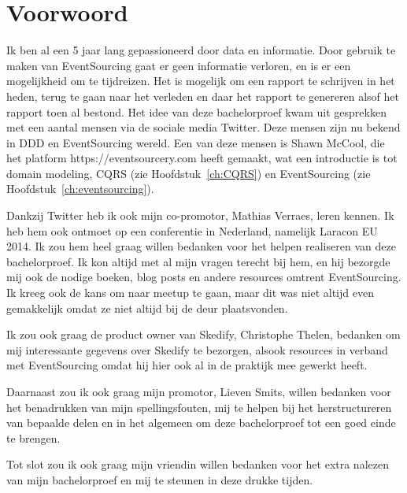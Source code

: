 
\chapter*{Voorwoord}
\label{ch:voorwoord}


Ik ben al een 5 jaar lang gepassioneerd door data en informatie. Door gebruik te maken van EventSourcing gaat er geen informatie verloren, en is er een mogelijkheid om te tijdreizen. Het is mogelijk om een rapport te schrijven in het heden, terug te gaan naar het verleden en daar het rapport te genereren alsof het rapport toen al bestond. Het idee van deze bachelorproef kwam uit gesprekken met een aantal mensen via de sociale media Twitter. Deze mensen zijn nu bekend in \gls{DDD} en EventSourcing wereld. Een van deze mensen is Shawn McCool, die het platform https://eventsourcery.com heeft gemaakt, wat een introductie is tot domain modeling, \gls{CQRS} (zie Hoofdstuk~\ref{ch:CQRS}) en EventSourcing (zie Hoofdstuk~\ref{ch:eventsourcing}).

Dankzij Twitter heb ik ook mijn co-promotor, Mathias Verraes, leren kennen. Ik heb hem ook ontmoet op een conferentie in Nederland, namelijk Laracon EU 2014. Ik zou hem heel graag willen bedanken voor het helpen realiseren van deze bachelorproef. Ik kon altijd met al mijn vragen terecht bij hem, en hij bezorgde mij ook de nodige boeken, blog posts en andere resources omtrent EventSourcing. Ik kreeg ook de kans om naar \gls{meetup} te gaan, maar dit was niet altijd even gemakkelijk omdat ze niet altijd bij de deur plaatsvonden.

Ik zou ook graag de product owner van Skedify, Christophe Thelen, bedanken om mij interessante gegevens over Skedify te bezorgen, alsook resources in verband met EventSourcing omdat hij hier ook al in de praktijk mee gewerkt heeft.

Daarnaast zou ik ook graag mijn promotor, Lieven Smits, willen bedanken voor het benadrukken van mijn spellingsfouten, mij te helpen bij het herstructureren van bepaalde delen en in het algemeen om deze bachelorproef tot een goed einde te brengen.

Tot slot zou ik ook graag mijn vriendin willen bedanken voor het extra nalezen van mijn bachelorproef en mij te steunen in deze drukke tijden.